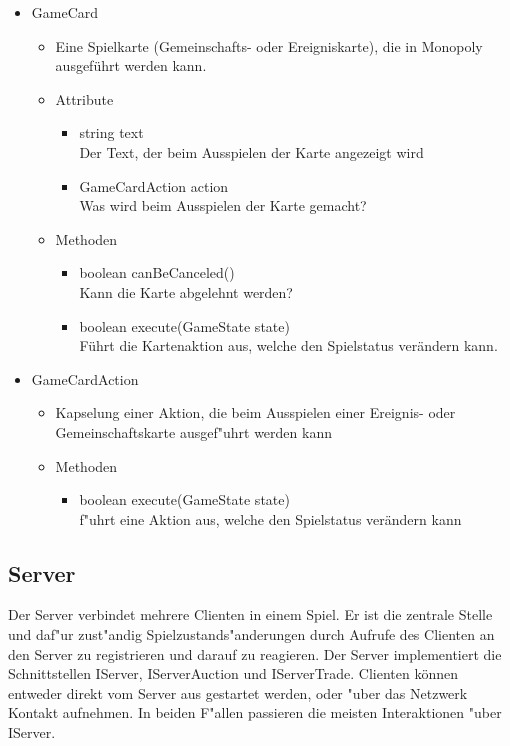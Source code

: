 \documentclass[a4paper,10pt]{article}
\begin{document}
\begin{itemize}
\item GameCard
\begin{itemize}
\item Eine Spielkarte (Gemeinschafts- oder Ereigniskarte), die in Monopoly ausgeführt werden kann.
\item Attribute
\begin{itemize}
\item string text
\\Der Text, der beim Ausspielen der Karte angezeigt wird
\item GameCardAction action
\\Was wird beim Ausspielen der Karte gemacht?
\end{itemize}
\item Methoden
\begin{itemize}
\item boolean canBeCanceled()
\\Kann die Karte abgelehnt werden?
\item boolean execute(GameState state)
\\Führt die Kartenaktion aus, welche den Spielstatus verändern kann.
\end{itemize}
\end{itemize}

\item GameCardAction
\begin{itemize}
\item Kapselung einer Aktion, die beim Ausspielen einer Ereignis- oder Gemeinschaftskarte ausgef"uhrt werden kann
\item Methoden
\begin{itemize}
\item boolean execute(GameState state)
\\f"uhrt eine Aktion aus, welche den Spielstatus verändern kann
\end{itemize}
\end{itemize}
\end{itemize} 

\subsection{Server}

Der Server verbindet mehrere Clienten in einem Spiel. Er ist die zentrale Stelle und daf"ur zust"andig Spielzustands"anderungen durch Aufrufe des Clienten an den Server zu registrieren und darauf zu reagieren. Der Server implementiert die Schnittstellen IServer, IServerAuction und IServerTrade. Clienten können entweder direkt vom Server aus gestartet werden, oder "uber das Netzwerk Kontakt aufnehmen. In beiden F"allen passieren die meisten Interaktionen "uber IServer.
\end{document}
